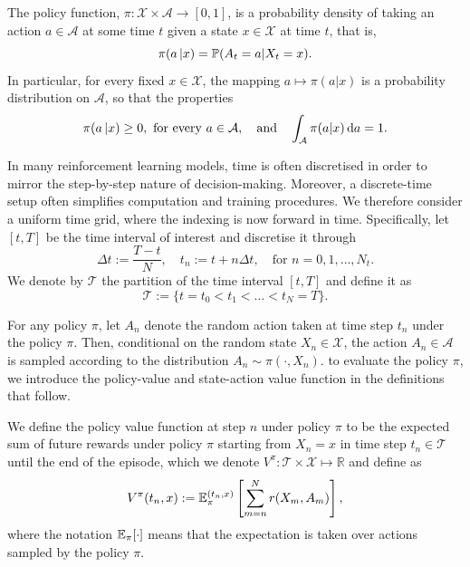\begin{definition}
\label{def: Stochastic policy function}
    The policy function, $\pi: \mathcal{X} \times \mathcal{A} \rightarrow [0,1]$, is a probability density of taking an action $a \in \mathcal{A}$ at some time $t$ given a state $x \in \mathcal{X}$ at time $t$, that is,
    \begin{equation*}
        \pi(a \, | x) = \mathbb{P}(A_t = a | X_t = x).
    \end{equation*}
    In particular, for every fixed $x \in \mathcal{X}$, the mapping $a \mapsto \pi(a | x) $ is a probability distribution on $\mathcal{A}$, so that the properties 
    \begin{equation*}
        \pi(a \, | x) \geq 0, \text{ for every } a \in \mathcal{A}, \quad \text{and} \quad \int_{\mathcal{A}} \pi(a | x) \,\mathrm{d} a = 1.
    \end{equation*}
\end{definition}

In many reinforcement learning models, time is often discretised in order to mirror the step-by-step nature of decision-making. Moreover, a discrete-time setup often simplifies computation and training procedures. We therefore consider a uniform time grid, where the indexing is now forward in time. Specifically, let $[t,T]$ be the time interval of interest and discretise it through
\begin{equation*}
    \Delta t := \frac{T-t}{N}, \quad t_n:= t+n \Delta t, \quad \text{for } n = 0,1,\ldots, N_t.
\end{equation*}
We denote by $\mathcal T$ the partition of the time interval $[t,T]$ and define it as
\begin{equation}
    \mathcal{T}:=\{t=t_0 < t_1 < \ldots < t_N = T\}. 
    \label{eqn: partition}
\end{equation}

For any policy $\pi$, let $A_n$ denote the random action taken at time step $t_n$ under the policy $\pi$. Then, conditional on the random state $X_n \in \mathcal X$, the action $A_n \in \mathcal A$ is sampled according to the distribution $A_n \sim \pi (\cdot, X_n)$. to evaluate the policy $\pi$, we introduce the policy-value and state-action value function in the definitions that follow.
\begin{definition}
\label{def: Policy-value function}
    We define the policy value function at step $n$ under policy $\pi$ to be the expected sum of future rewards under policy $\pi$ starting from $X_n = x$ in time step $t_n \in \mathcal T$ until the end of the episode, which we denote $V^\pi: \mathcal T \times \mathcal X \mapsto \mathbb R$ and define as
    \begin{equation*}
        V^\pi(t_n,x) := \mathbb{E}^{(t_n,x)}_\pi \left[\sum_{m=n}^N r(X_{m}, A_m)\right],
    \end{equation*}
    where the notation $\mathbb{E}_\pi[\cdot]$ means that the expectation is taken over actions sampled by the policy $\pi$. 
\end{definition}

